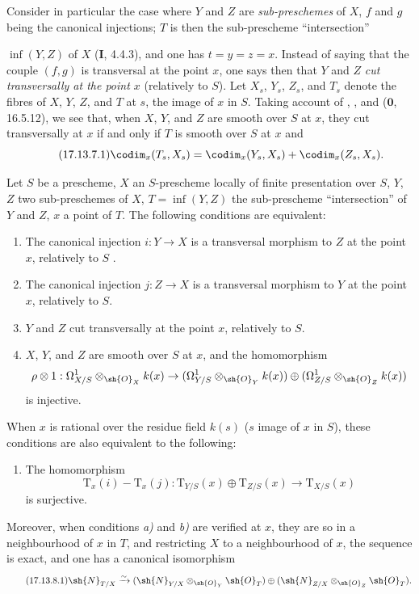 \begin{env}[17.13.7]
\label{IV.17.13.7}
Consider in particular the case where $Y$ and $Z$ are \emph{sub-preschemes} of $X$, $f$ and $g$ being the canonical injections; $T$ is then the sub-prescheme ``intersection''


$\inf(Y,Z)$ of $X$ (\textbf{I}, 4.4.3), and one has $t=y=z=x$.
Instead of saying that the couple $(f,g)$ is transversal at the point $x$, one says then that $Y$ and $Z$ \emph{cut transversally at the point $x$} (relatively to $S$).
Let $X_s$, $Y_s$, $Z_s$, and $T_s$ denote the fibres of $X$, $Y$, $Z$, and $T$ at $s$, the image of $x$ in $S$.
Taking account of , , and ($\mathbf{0}$, 16.5.12), we see that, when $X$, $Y$, and $Z$ are smooth over $S$ at $x$, they cut transversally at $x$ if and only if $T$ is smooth over $S$ at $x$ and
\[
\label{IV.17.13.7.1}
\tag{17.13.7.1}
\codim_x(T_s,X_s) = \codim_x(Y_s,X_s) + \codim_x(Z_s,X_s).
\]
\end{env}

\begin{proposition}[17.13.8]
\label{IV.17.13.8}
Let $S$ be a prescheme, $X$ an $S$-prescheme locally of finite presentation over $S$, $Y$, $Z$ two sub-preschemes of $X$, $T=\inf(Y,Z)$ the sub-prescheme ``intersection'' of $Y$ and $Z$, $x$ a point of $T$.
The following conditions are equivalent:
\begin{enumerate}
  \item[a)] The canonical injection $i:Y\to X$ is a transversal morphism to $Z$ at the point $x$, relatively to $S$ .
  \item[a${}'$)] The canonical injection $j:Z\to X$ is a transversal morphism to $Y$ at the point $x$, relatively to $S$.
  \item[a${}''$)] $Y$ and $Z$ cut transversally at the point $x$, relatively to $S$.
  \item[b)] $X$, $Y$, and $Z$ are smooth over $S$ at $x$, and the homomorphism
  \[
    \rho\otimes 1: \Omega^1_{X/S}\otimes_{\sh{O}_X}k(x) \to (\Omega^1_{Y/S}\otimes_{\sh{O}_Y}k(x))\oplus(\Omega^1_{Z/S}\otimes_{\sh{O}_Z}k(x))
  \]
  is injective.
\end{enumerate}
When $x$ is rational over the residue field $k(s)$ ($s$ image of $x$ in $S$), these conditions are also equivalent to the following:
\begin{enumerate}
  \item[b${}'$)] The homomorphism
  \[
    \mathrm{T}_x(i)-\mathrm{T}_x(j): \mathrm{T}_{Y/S}(x)\oplus\mathrm{T}_{Z/S}(x) \to \mathrm{T}_{X/S}(x)
  \]
  is surjective.
\end{enumerate}
Moreover, when conditions \emph{a)} and \emph{b)} are verified at $x$, they are so in a neighbourhood of $x$ in $T$, and restricting $X$ to a neighbourhood of $x$, the sequence  is exact, and one has a canonical isomorphism
\[
\label{IV.17.13.8.1}
\tag{17.13.8.1}
\sh{N}_{T/X} \xrightarrow{\sim} (\sh{N}_{Y/X}\otimes_{\sh{O}_Y}\sh{O}_T)\oplus(\sh{N}_{Z/X}\otimes_{\sh{O}_Z}\sh{O}_T).
\]
\end{proposition}


